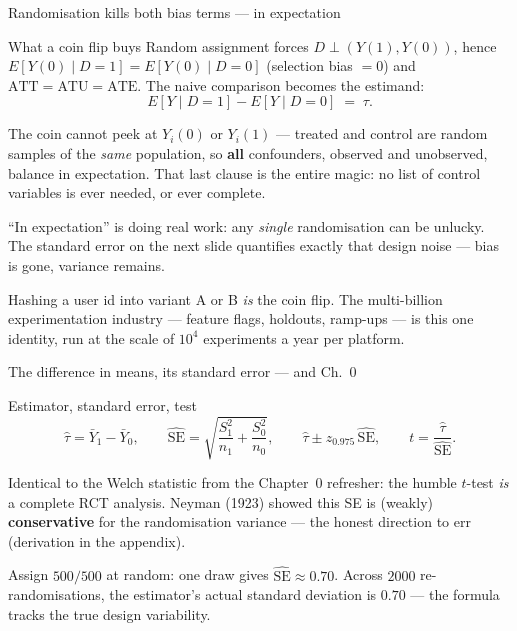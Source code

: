 \documentclass[aspectratio=169,11pt]{beamer}
\begin{document}
\begin{frame}{Randomisation kills both bias terms --- in expectation}
  \begin{block}{What a coin flip buys}
    Random assignment forces $D \perp (Y(1),Y(0))$, hence
    $E[Y(0)\mid D{=}1] = E[Y(0)\mid D{=}0]$ (selection bias $=0$) and
    $\text{ATT}=\text{ATU}=\text{ATE}$. The naive comparison becomes the estimand:
    \[
      \boxed{\;E[Y\mid D=1]-E[Y\mid D=0] \;=\; \tau.\;}
    \]
  \end{block}
  \begin{readme}
    The coin cannot peek at $Y_i(0)$ or $Y_i(1)$ --- treated and control are random
    samples of the \emph{same} population, so \textbf{all} confounders, observed and
    unobserved, balance in expectation. That last clause is the entire magic: no list of
    control variables is ever needed, or ever complete.
  \end{readme}
  \begin{takeaway}
    ``In expectation'' is doing real work: any \emph{single} randomisation can be
    unlucky. The standard error on the next slide quantifies exactly that design noise
    --- bias is gone, variance remains.
  \end{takeaway}
  \begin{industry}
    Hashing a user id into variant A or B \emph{is} the coin flip. The multi-billion
    experimentation industry --- feature flags, holdouts, ramp-ups --- is this one
    identity, run at the scale of $10^4$ experiments a year per platform.
  \end{industry}
\end{frame}

\begin{frame}{The difference in means, its standard error --- and Ch.\ 0}
  \begin{block}{Estimator, standard error, test}
    \[
      \hat\tau = \bar Y_1 - \bar Y_0, \qquad
      \widehat{\mathrm{SE}} = \sqrt{\frac{S_1^2}{n_1} + \frac{S_0^2}{n_0}}, \qquad
      \hat\tau \pm z_{0.975}\,\widehat{\mathrm{SE}}, \qquad
      t = \frac{\hat\tau}{\widehat{\mathrm{SE}}}.
    \]
  \end{block}
  \begin{readme}
    Identical to the Welch statistic from the Chapter~0 refresher: the humble $t$-test
    \emph{is} a complete RCT analysis. Neyman (1923) showed this SE is (weakly)
    \textbf{conservative} for the randomisation variance --- the honest direction to err
    (derivation in the appendix).
  \end{readme}
  \begin{numexample}
    Assign $500/500$ at random: one draw gives $\widehat{\mathrm{SE}} \approx 0.70$.
    Across $2000$ re-randomisations, the estimator's actual standard deviation is
    $0.70$ --- the formula tracks the true design variability.
  \end{numexample}
\end{frame}
\end{document}
